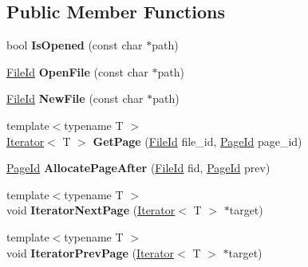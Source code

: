 \subsection*{Public Member Functions}
\begin{DoxyCompactItemize}
\item 
\mbox{\label{class_buffer_manager_a2713f7e998dc536389fb8d74f92c53e2}} 
bool {\bfseries Is\+Opened} (const char $\ast$path)
\item 
\mbox{\label{class_buffer_manager_a64a8a1b316a30dd37763d53a3ff6dac8}} 
\mbox{\hyperlink{struct_generic_i_o_id}{File\+Id}} {\bfseries Open\+File} (const char $\ast$path)
\item 
\mbox{\label{class_buffer_manager_a20113f877ed39ee6593b31f8dccf946d}} 
\mbox{\hyperlink{struct_generic_i_o_id}{File\+Id}} {\bfseries New\+File} (const char $\ast$path)
\item 
\mbox{\label{class_buffer_manager_a7b6c9ee9cc42f934432199f92ef0dd7f}} 
{\footnotesize template$<$typename T $>$ }\\\mbox{\hyperlink{class_buffer_manager_1_1_iterator}{Iterator}}$<$ T $>$ {\bfseries Get\+Page} (\mbox{\hyperlink{struct_generic_i_o_id}{File\+Id}} file\+\_\+id, \mbox{\hyperlink{struct_generic_i_o_id}{Page\+Id}} page\+\_\+id)
\item 
\mbox{\label{class_buffer_manager_ae3ac3fa222aaec06eb818fe132e7551a}} 
\mbox{\hyperlink{struct_generic_i_o_id}{Page\+Id}} {\bfseries Allocate\+Page\+After} (\mbox{\hyperlink{struct_generic_i_o_id}{File\+Id}} fid, \mbox{\hyperlink{struct_generic_i_o_id}{Page\+Id}} prev)
\item 
\mbox{\label{class_buffer_manager_a73139131df9e65d8f1df68a4e83599b4}} 
{\footnotesize template$<$typename T $>$ }\\void {\bfseries Iterator\+Next\+Page} (\mbox{\hyperlink{class_buffer_manager_1_1_iterator}{Iterator}}$<$ T $>$ $\ast$target)
\item 
\mbox{\label{class_buffer_manager_a2b7137a1335875bb314f0f8c4ba5769e}} 
{\footnotesize template$<$typename T $>$ }\\void {\bfseries Iterator\+Prev\+Page} (\mbox{\hyperlink{class_buffer_manager_1_1_iterator}{Iterator}}$<$ T $>$ $\ast$target)

\end{DoxyCompactItemize}
